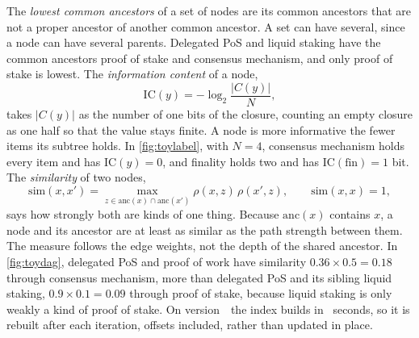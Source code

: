 The \emph{lowest common ancestors} of a set of nodes are its common
ancestors that are not a proper ancestor of another common ancestor. A set
can have several, since a node can have several parents. Delegated PoS and
liquid staking have the common ancestors proof of stake and consensus
mechanism, and only proof of stake is lowest. The \emph{information content}
of a node,
\begin{equation}
  \label{eq:ic}
  \mathrm{IC}(y) = -\log_2 \frac{|C(y)|}{N},
\end{equation}
takes $|C(y)|$ as the number of one bits of the closure, counting an empty
closure as one half so that the value stays finite. A node is more
informative the fewer items its subtree holds. In \cref{fig:toylabel}, with
$N = 4$, consensus mechanism holds every item and has $\mathrm{IC}(y) = 0$,
and finality holds two and has $\mathrm{IC}(\mathrm{fin}) = 1$ bit. The
\emph{similarity} of two nodes,
\begin{equation}
  \label{eq:sim}
  \mathrm{sim}(x, x') = \max_{z \in \mathrm{anc}(x) \cap \mathrm{anc}(x')}
  \rho(x, z)\, \rho(x', z), \qquad \mathrm{sim}(x, x) = 1,
\end{equation}
says how strongly both are kinds of one thing. Because $\mathrm{anc}(x)$
contains $x$, a node and its ancestor are at least as similar as the path
strength between them. The measure follows the edge weights, not the depth
of the shared ancestor. In \cref{fig:toydag}, delegated PoS and proof of
work have similarity $0.36 \times 0.5 = 0.18$ through consensus mechanism,
more than delegated PoS and its sibling liquid staking, $0.9 \times 0.1 =
0.09$ through proof of stake, because liquid staking is only weakly a kind
of proof of stake. On version~\RCat\ the index builds in \RBuildSec\
seconds, so it is rebuilt after each iteration, offsets included, rather
than updated in place.

